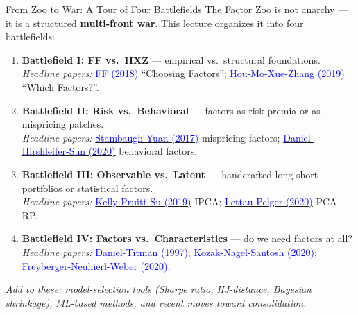\documentclass{beamer}
\begin{document}
\begin{frame}{From Zoo to War: A Tour of Four Battlefields}
	The Factor Zoo is not anarchy --- it is a structured \textbf{multi-front war}. This lecture organizes it into four battlefields:
	\vspace{6pt}
	\begin{enumerate}
		\item \textbf{Battlefield I: FF vs.\ HXZ} --- empirical vs.\ structural foundations. \\
		\textit{Headline papers:} \href{https://doi.org/10.1016/j.jfineco.2018.02.012}{\textcolor{blue}{FF (2018)}} ``Choosing Factors''; \href{https://doi.org/10.1093/rof/rfy032}{\textcolor{blue}{Hou-Mo-Xue-Zhang (2019)}} ``Which Factors?''.
		\item \textbf{Battlefield II: Risk vs.\ Behavioral} --- factors as risk premia or as mispricing patches. \\
		\textit{Headline papers:} \href{https://doi.org/10.1093/rfs/hhw107}{\textcolor{blue}{Stambaugh-Yuan (2017)}} mispricing factors; \href{https://doi.org/10.1093/rfs/hhz069}{\textcolor{blue}{Daniel-Hirshleifer-Sun (2020)}} behavioral factors.
		\item \textbf{Battlefield III: Observable vs.\ Latent} --- handcrafted long-short portfolios or statistical factors. \\
		\textit{Headline papers:} \href{https://doi.org/10.1016/j.jfineco.2019.05.001}{\textcolor{blue}{Kelly-Pruitt-Su (2019)}} IPCA; \href{https://doi.org/10.1093/rfs/hhaa020}{\textcolor{blue}{Lettau-Pelger (2020)}} PCA-RP.
		\item \textbf{Battlefield IV: Factors vs.\ Characteristics} --- do we need factors at all? \\
		\textit{Headline papers:} \href{https://doi.org/10.1111/j.1540-6261.1997.tb02724.x}{\textcolor{blue}{Daniel-Titman (1997)}}; \href{https://doi.org/10.1111/jofi.12876}{\textcolor{blue}{Kozak-Nagel-Santosh (2020)}}; \href{https://doi.org/10.1093/rfs/hhz123}{\textcolor{blue}{Freyberger-Neuhierl-Weber (2020)}}.
	\end{enumerate}
	\vspace{4pt}
	\textit{Add to these: model-selection \textit{tools} (Sharpe ratio, HJ-distance, Bayesian shrinkage), ML-based methods, and recent moves toward consolidation.}
\end{frame}
\end{document}
